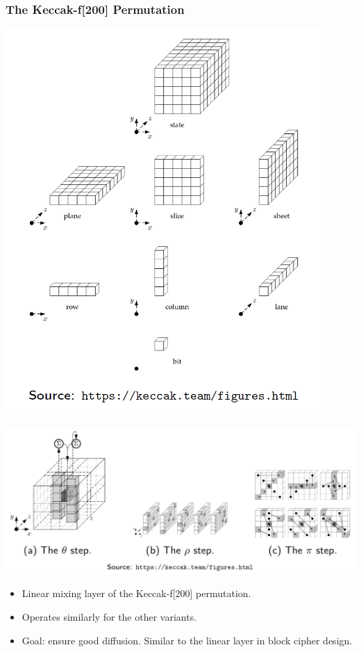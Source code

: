 		\subsubsection{The Keccak-f[200] Permutation}
			\begin{center}
				\includegraphics[width=120mm]{Graphics/Hash Functions/hf10.png}
			\end{center}
		   	\begin{center}
				\includegraphics[width=140mm]{Graphics/Hash Functions/hf11.png}
			\end{center}
			\begin{itemize}
				\item Linear mixing layer of the Keccak-f[200] permutation.
				\item Operates similarly for the other variants.
				\item Goal: ensure good diffusion. Similar to the linear layer in block cipher design.
			\end{itemize}
